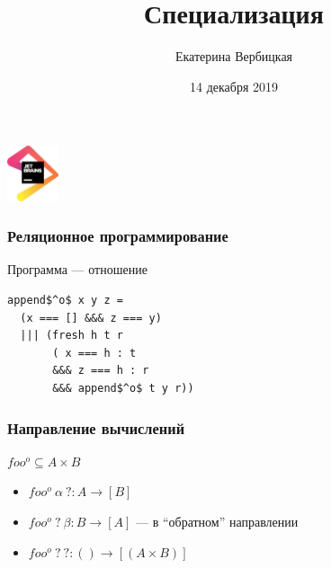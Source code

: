 \documentclass{beamer}
\title[]{Специализация \miniKanren}
\institute[]{
Лаборатория языковых инструментов JetBrains
}
\author[Екатерина Вербицкая]{Екатерина Вербицкая}
\date{14 декабря 2019}
\begin{document}
{

\begin{frame}
      \begin{center} 
        {\includegraphics[width=1.5cm]{pics/jb.png}} 
      \end{center}

  \titlepage
\end{frame}
}

\begin{frame}[fragile]
  \transwipe[direction=90]
  \frametitle{Реляционное программирование}
 
 \begin{center}
    Программа --- отношение 
 \end{center}

 \vfill
  
  \begin{center}
    \begin{minipage}{4.5cm}
    \begin{lstlisting}[frame=single]  
append$^o$ x y z = 
  (x === [] &&& z === y)
  ||| (fresh h t r
       ( x === h : t 
       &&& z === h : r 
       &&& append$^o$ t y r))
    \end{lstlisting}
    \end{minipage}
    \end{center}
\end{frame}


\begin{frame}[fragile]
  \transwipe[direction=90]
  \frametitle{Направление вычислений}

\begin{center}
  $foo^o \subseteq A \times B$
\end{center}

\vfill

\begin{itemize}
  \item $foo^o \ \alpha \ ? : A \rightarrow [B]$
  \item $foo^o \ ? \ \beta  : B \rightarrow [A]$ --- в ``обратном'' направлении
  \item $foo^o \ ? \ ?      : () \rightarrow [(A \times B)] $ 
\end{itemize}  

\end{frame}
\end{document}
